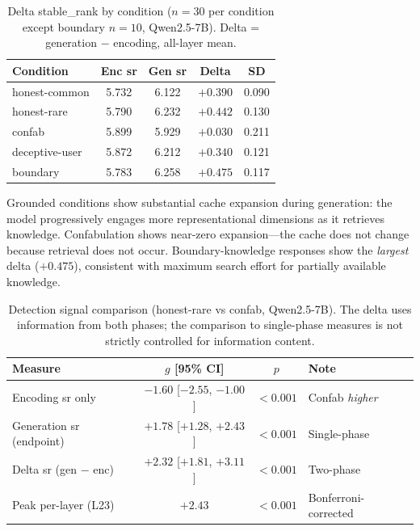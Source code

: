 \documentclass[11pt,a4paper]{article}
\begin{document}
\begin{table}[ht]
\centering
\caption{Delta stable\_rank by condition ($n = 30$ per condition
  except boundary $n = 10$, Qwen2.5-7B). Delta = generation $-$
  encoding, all-layer mean.}
\label{tab:delta}
\begin{tabular}{lcccc}
\toprule
\textbf{Condition} & \textbf{Enc sr} & \textbf{Gen sr} & \textbf{Delta} & \textbf{SD} \\
\midrule
honest-common & 5.732 & 6.122 & $+0.390$ & 0.090 \\
honest-rare & 5.790 & 6.232 & $+0.442$ & 0.130 \\
confab & 5.899 & 5.929 & $+0.030$ & 0.211 \\
deceptive-user & 5.872 & 6.212 & $+0.340$ & 0.121 \\
boundary & 5.783 & 6.258 & $+0.475$ & 0.117 \\
\bottomrule
\end{tabular}
\end{table}

Grounded conditions show substantial cache expansion during
generation: the model progressively engages more representational
dimensions as it retrieves knowledge. Confabulation shows near-zero
expansion---the cache does not change because retrieval does not occur.
Boundary-knowledge responses show the \emph{largest} delta ($+0.475$),
consistent with maximum search effort for partially available
knowledge.

\begin{table}[ht]
\centering
\caption{Detection signal comparison (honest-rare vs confab,
  Qwen2.5-7B). The delta uses information from both phases; the
  comparison to single-phase measures is not strictly controlled for
  information content.}
\label{tab:comparison}
\begin{tabular}{lccl}
\toprule
\textbf{Measure} & \textbf{$g$ [95\% CI]} & \textbf{$p$} & \textbf{Note} \\
\midrule
Encoding sr only & $-1.60$ [$-2.55$, $-1.00$] & $< 0.001$ & Confab \emph{higher} \\
Generation sr (endpoint) & $+1.78$ [$+1.28$, $+2.43$] & $< 0.001$ & Single-phase \\
Delta sr (gen $-$ enc) & $+2.32$ [$+1.81$, $+3.11$] & $< 0.001$ & Two-phase \\
Peak per-layer (L23) & $+2.43$ & $< 0.001$ & Bonferroni-corrected \\
\bottomrule
\end{tabular}
\end{table}
\end{document}

